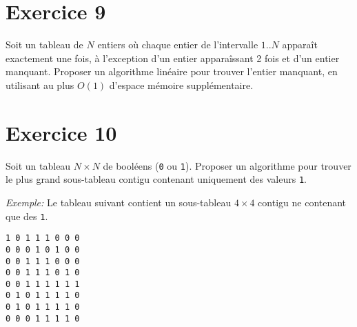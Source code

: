 \documentclass[a4paper,10pt]{article}
\begin{document}
\section*{Exercice 9}

Soit un tableau de $N$ entiers où chaque entier de l'intervalle $1..N$ apparaît exactement une fois, à l'exception d'un entier apparaîssant 2 fois et d'un entier manquant.
Proposer un algorithme linéaire pour trouver l'entier manquant, en utilisant au plus $O(1)$ d'espace mémoire supplémentaire.

\section*{Exercice 10}

Soit un tableau $N \times N$ de booléens (\texttt{0} ou \texttt{1}). Proposer un algorithme pour trouver le plus grand sous-tableau contigu contenant uniquement des valeurs \texttt{1}.

\textit{Exemple:} Le tableau suivant contient un sous-tableau $4 \times 4$ contigu ne contenant que des \texttt{1}.

\begin{verbatim}
1 0 1 1 1 0 0 0
0 0 0 1 0 1 0 0
0 0 1 1 1 0 0 0
0 0 1 1 1 0 1 0
0 0 1 1 1 1 1 1
0 1 0 1 1 1 1 0
0 1 0 1 1 1 1 0
0 0 0 1 1 1 1 0
\end{verbatim}
\end{document}
